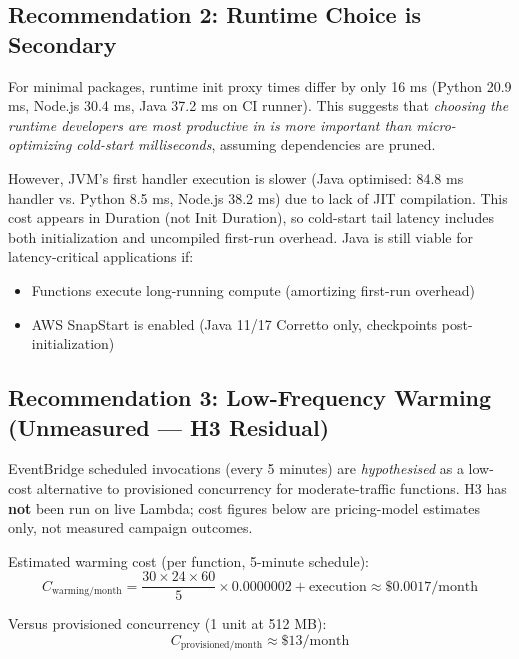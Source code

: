 \subsection{Recommendation 2: Runtime Choice is Secondary}

For minimal packages, runtime init proxy times differ by only 16 ms (Python 20.9 ms, Node.js 30.4 ms, Java 37.2 ms on CI runner). This suggests that \textit{choosing the runtime developers are most productive in is more important than micro-optimizing cold-start milliseconds}, assuming dependencies are pruned.

However, JVM's first handler execution is slower (Java optimised: 84.8 ms handler vs. Python 8.5 ms, Node.js 38.2 ms) due to lack of JIT compilation. This cost appears in Duration (not Init Duration), so cold-start tail latency includes both initialization and uncompiled first-run overhead. Java is still viable for latency-critical applications if:

\begin{itemize}
    \item Functions execute long-running compute (amortizing first-run overhead)
    \item AWS SnapStart is enabled (Java 11/17 Corretto only, checkpoints post-initialization)
\end{itemize}

\subsection{Recommendation 3: Low-Frequency Warming (Unmeasured --- H3 Residual)}

EventBridge scheduled invocations (every 5 minutes) are \textit{hypothesised} as a low-cost alternative to provisioned concurrency for moderate-traffic functions. H3 has \textbf{not} been run on live Lambda; cost figures below are pricing-model estimates only, not measured campaign outcomes.

Estimated warming cost (per function, 5-minute schedule):
\begin{equation}
C_{\text{warming/month}} = \frac{30 \times 24 \times 60}{5} \times 0.0000002 + \text{execution} \approx \$0.0017/\text{month}
\end{equation}

Versus provisioned concurrency (1 unit at 512 MB):
\begin{equation}
C_{\text{provisioned/month}} \approx \$13/\text{month}
\end{equation}

